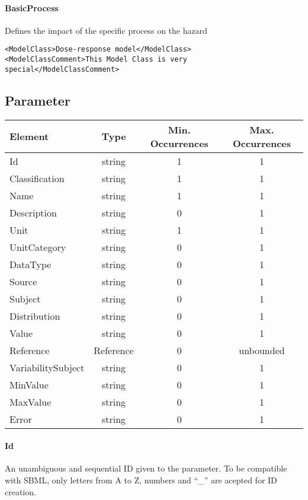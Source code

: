\documentclass[a4paper]{report}
\begin{document}
\paragraph{BasicProcess}
Defines the impact of the specific process on the hazard

\begin{lstlisting}[language=RAKIP, caption={Example of ModelCategory}]
<ModelClass>Dose-response model</ModelClass>
<ModelClassComment>This Model Class is very special</ModelClassComment>
\end{lstlisting}

\subsection{Parameter}

\begin{tabular}{|l|c|c|c|}
    \hline
    \textbf{Element} & \textbf{Type} & \textbf{Min. Occurrences} & \textbf{Max. Occurrences} \\    
    \hline
    Id & string & 1 & 1 \\
    Classification & string & 1 & 1 \\
    Name & string & 1 & 1 \\
    Description & string & 0 & 1 \\
    Unit & string & 1 & 1 \\
    UnitCategory & string & 0 & 1 \\
    DataType & string & 0 & 1 \\
    Source & string & 0 & 1 \\
    Subject & string & 0 & 1 \\
    Distribution & string & 0 & 1 \\
    Value & string & 0 & 1 \\
    Reference & Reference & 0 & unbounded \\
    VariabilitySubject & string & 0 & 1 \\
    MinValue & string & 0 & 1 \\
    MaxValue & string & 0 & 1 \\
    Error & string & 0 & 1 \\
    \hline
\end{tabular}

\paragraph{Id}
An unambiguous and sequential ID given to the parameter. To be compatible with SBML, only letters from A to Z, numbers and ``\_'' are acepted for ID creation.
\end{document}
